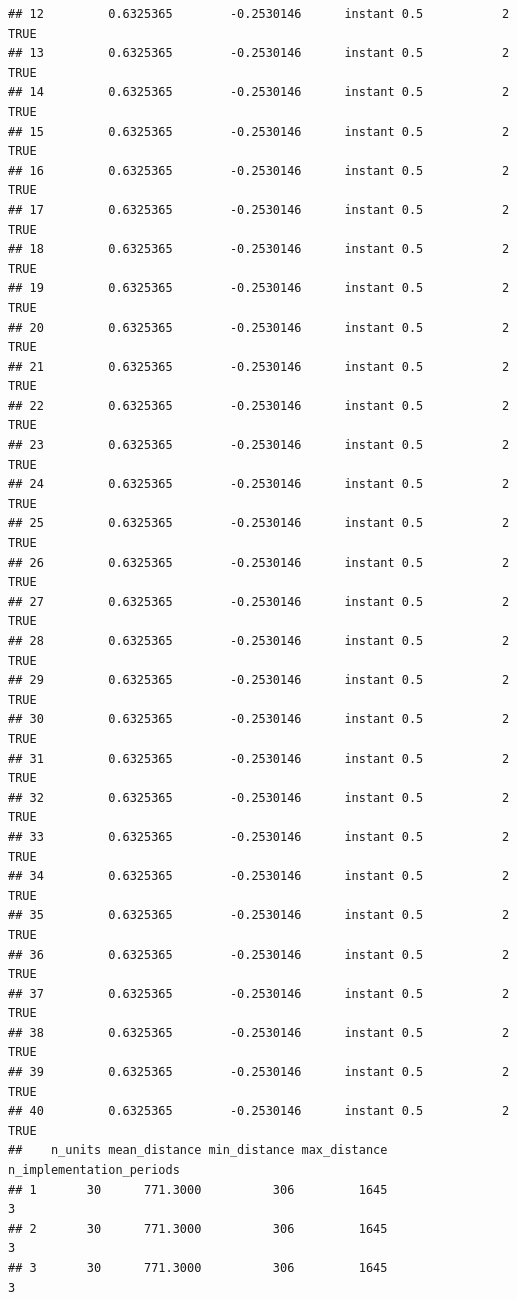 \documentclass[
]{article}
\begin{document}
\begin{verbatim}
## 12         0.6325365        -0.2530146      instant 0.5           2    TRUE
## 13         0.6325365        -0.2530146      instant 0.5           2    TRUE
## 14         0.6325365        -0.2530146      instant 0.5           2    TRUE
## 15         0.6325365        -0.2530146      instant 0.5           2    TRUE
## 16         0.6325365        -0.2530146      instant 0.5           2    TRUE
## 17         0.6325365        -0.2530146      instant 0.5           2    TRUE
## 18         0.6325365        -0.2530146      instant 0.5           2    TRUE
## 19         0.6325365        -0.2530146      instant 0.5           2    TRUE
## 20         0.6325365        -0.2530146      instant 0.5           2    TRUE
## 21         0.6325365        -0.2530146      instant 0.5           2    TRUE
## 22         0.6325365        -0.2530146      instant 0.5           2    TRUE
## 23         0.6325365        -0.2530146      instant 0.5           2    TRUE
## 24         0.6325365        -0.2530146      instant 0.5           2    TRUE
## 25         0.6325365        -0.2530146      instant 0.5           2    TRUE
## 26         0.6325365        -0.2530146      instant 0.5           2    TRUE
## 27         0.6325365        -0.2530146      instant 0.5           2    TRUE
## 28         0.6325365        -0.2530146      instant 0.5           2    TRUE
## 29         0.6325365        -0.2530146      instant 0.5           2    TRUE
## 30         0.6325365        -0.2530146      instant 0.5           2    TRUE
## 31         0.6325365        -0.2530146      instant 0.5           2    TRUE
## 32         0.6325365        -0.2530146      instant 0.5           2    TRUE
## 33         0.6325365        -0.2530146      instant 0.5           2    TRUE
## 34         0.6325365        -0.2530146      instant 0.5           2    TRUE
## 35         0.6325365        -0.2530146      instant 0.5           2    TRUE
## 36         0.6325365        -0.2530146      instant 0.5           2    TRUE
## 37         0.6325365        -0.2530146      instant 0.5           2    TRUE
## 38         0.6325365        -0.2530146      instant 0.5           2    TRUE
## 39         0.6325365        -0.2530146      instant 0.5           2    TRUE
## 40         0.6325365        -0.2530146      instant 0.5           2    TRUE
##    n_units mean_distance min_distance max_distance n_implementation_periods
## 1       30      771.3000          306         1645                        3
## 2       30      771.3000          306         1645                        3
## 3       30      771.3000          306         1645                        3

\end{verbatim}
\end{document}
